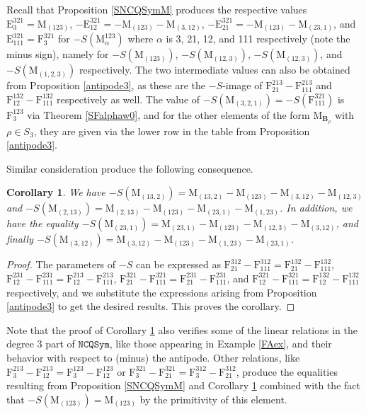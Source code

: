 \documentclass{article}
\newtheorem{cor}[thm]{Corollary}
\theoremstyle{definition}
\begin{document}
Recall that Proposition \ref{SNCQSymM} produces the respective values $\mathrm{E}_{3}^{321}=\mathrm{M}_{(123)}$, $-\mathrm{E}_{12}^{321}=-\mathrm{M}_{(123)}-\mathrm{M}_{(3,12)}$, $-\mathrm{E}_{21}^{321}=-\mathrm{M}_{(123)}-\mathrm{M}_{(23,1)}$, and $\mathrm{E}_{111}^{321}=\mathrm{F}_{3}^{321}$ for $-S(\mathrm{M}_{\alpha}^{123})$ where $\alpha$ is 3, 21, 12, and 111 respectively (note the minus sign), namely for $-S(\mathrm{M}_{(123)})$, $-S(\mathrm{M}_{(12,3)})$, $-S(\mathrm{M}_{(12,3)})$, and $-S(\mathrm{M}_{(1,2,3)})$ respectively. The two intermediate values can also be obtained from Proposition \ref{antipode3}, as these are the $-S$-image of $\mathrm{F}_{21}^{213}-\mathrm{F}_{111}^{213}$ and $\mathrm{F}_{12}^{132}-\mathrm{F}_{111}^{132}$ respectively as well. The value of $-S(\mathrm{M}_{(3,2,1)})=-S(\mathrm{F}_{111}^{321})$ is $\mathrm{F}_{3}^{123}$ via Theorem \ref{SFalphaw0}, and for the other elements of the form $\mathrm{M}_{\mathbf{B}_{\rho}}$ with $\rho \in S_{3}$, they are given via the lower row in the table from Proposition \ref{antipode3}.

Similar consideration produce the following consequence.
\begin{cor}
We have $-S(\mathrm{M}_{(13,2)})=\mathrm{M}_{(13,2)}-\mathrm{M}_{(123)}-\mathrm{M}_{(3,12)}-\mathrm{M}_{(12,3)}$ and  $-S(\mathrm{M}_{(2,13)})=\mathrm{M}_{(2,13)}-\mathrm{M}_{(123)}-\mathrm{M}_{(23,1)}-\mathrm{M}_{(1,23)}$. In addition, we have the equality $-S(\mathrm{M}_{(23,1)})=\mathrm{M}_{(23,1)}-\mathrm{M}_{(123)}-\mathrm{M}_{(12,3)}-\mathrm{M}_{(3,12)}$, and finally $-S(\mathrm{M}_{(3,12)})=\mathrm{M}_{(3,12)}-\mathrm{M}_{(123)}-\mathrm{M}_{(1,23)}-\mathrm{M}_{(23,1)}$. \label{antiM3}
\end{cor}

\begin{proof}
The parameters of $-S$ can be expressed as $\mathrm{F}_{21}^{312}-\mathrm{F}_{111}^{312}=\mathrm{F}_{21}^{132}-\mathrm{F}_{111}^{132}$, $\mathrm{F}_{12}^{231}-\mathrm{F}_{111}^{231}=\mathrm{F}_{12}^{213}-\mathrm{F}_{111}^{213}$, $\mathrm{F}_{21}^{321}-\mathrm{F}_{111}^{321}=\mathrm{F}_{21}^{231}-\mathrm{F}_{111}^{231}$, and  $\mathrm{F}_{12}^{321}-\mathrm{F}_{111}^{321}=\mathrm{F}_{12}^{132}-\mathrm{F}_{111}^{132}$ respectively, and we substitute the expressions arising from Proposition \ref{antipode3} to get the desired results. This proves the corollary.
\end{proof}
Note that the proof of Corollary \ref{antiM3} also verifies some of the linear relations in the degree 3 part of $\mathtt{NCQSym}$, like those appearing in Example \ref{FAex}, and their behavior with respect to (minus) the antipode. Other relations, like $\mathrm{F}_{3}^{213}-\mathrm{F}_{12}^{213}=\mathrm{F}_{3}^{123}-\mathrm{F}_{12}^{123}$ or $\mathrm{F}_{3}^{321}-\mathrm{F}_{21}^{321}=\mathrm{F}_{3}^{312}-\mathrm{F}_{21}^{312}$, produce the equalities resulting from Proposition \ref{SNCQSymM} and Corollary \ref{antiM3} combined with the fact that $-S(\mathrm{M}_{(123)})=\mathrm{M}_{(123)}$ by the primitivity of this element.
\end{document}
